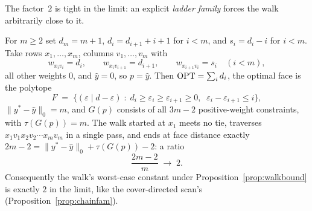 The factor~$2$ is tight in the limit: an explicit \emph{ladder family} forces the walk arbitrarily
close to it.

\begin{proposition}\label{prop:ladderfam}
For $m \ge 2$ set $d_m = m + 1$, $d_i = d_{i+1} + i + 1$ for $i < m$, and
$s_i = d_i - i$ for $i < m$. Take rows $x_1, \dots, x_m$, columns $v_1, \dots, v_m$ with
\[
  w_{x_i v_i} = d_i, \qquad w_{x_i v_{i+1}} = d_{i+1}, \qquad w_{x_{i+1} v_i} = s_i
  \quad (i < m),
\]
all other weights $0$, and $\hat y = 0$, so $p = \hat y$. Then $\mathrm{OPT} = \sum_i d_i$, the
optimal face is the polytope
\[
  F \;=\; \bigl\{ (\varepsilon \mid d - \varepsilon) \;:\;
  d_i \ge \varepsilon_i \ge \varepsilon_{i+1} \ge 0, \;\;
  \varepsilon_i - \varepsilon_{i+1} \le i \bigr\},
\]
$\|y^* - \hat y\|_0 = m$, and $G(p)$ consists of all $3m - 2$ positive-weight
constraints, with $\tau(G(p)) = m$. The walk started at $x_1$ meets no tie, traverses
$x_1 v_1 x_2 v_2 \cdots x_m v_m$ in a single pass, and ends at face distance exactly
$2m - 2 = \|y^* - \hat y\|_0 + \tau(G(p)) - 2$: a ratio
\[
  \frac{2m - 2}{m} \;\longrightarrow\; 2 .
\]
Consequently the walk's worst-case constant under Proposition~\ref{prop:walkbound} is
exactly $2$ in the limit, like the cover-directed scan's (Proposition~\ref{prop:chainfam}).
\end{proposition}

